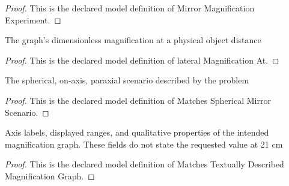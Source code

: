 \begin{proof}
  This is the declared model definition of Mirror Magnification Experiment.
\end{proof}
\begin{definition}
  \label{def:physics:phyx-mini-0478:phyxminiproblems-problemphyxmini0478-lateralmagnificationat}
  The graph's dimensionless magnification at a physical object distance
\end{definition}
\begin{proof}
  This is the declared model definition of lateral Magnification At.
\end{proof}
\begin{definition}
  \label{def:physics:phyx-mini-0478:phyxminiproblems-problemphyxmini0478-matchessphericalmirrorscenario}
  The spherical, on-axis, paraxial scenario described by the problem
\end{definition}
\begin{proof}
  This is the declared model definition of Matches Spherical Mirror Scenario.
\end{proof}
\begin{definition}
  \label{def:physics:phyx-mini-0478:phyxminiproblems-problemphyxmini0478-matchestextuallydescribedmagnificationgraph}
  Axis labels, displayed ranges, and qualitative properties of the intended magnification graph. These fields do not state the requested value at 21 cm
\end{definition}
\begin{proof}
  This is the declared model definition of Matches Textually Described Magnification Graph.
\end{proof}
